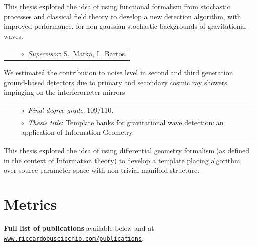 {\small This thesis explored the idea of using functional formalism from stochastic processes and classical field theory to develop a new detection algorithm, with improved performance, for non-gaussian stochastic backgrounds of gravitational waves.}

\vspace{0.2cm}
\vspace{-0.1cm}
\begin{tabular}{rcl}
&\hspace{0.4cm} &$\circ\;\;${\textit{Supervisor}}: S.~Marka, I.~Bartos.
\end{tabular}
\vspace{0.2cm}

{\small We estimated the contribution to noise level in second and third generation ground-based detectors due to primary and secondary cosmic ray showers impinging on the interferometer mirrors.}

\vspace{0.2cm}
\vspace{-0.1cm}
\begin{tabular}{rcl}
&\hspace{0.4cm} &$\circ\;\;${\textit{Final degree grade}}: 109/110.\\
&\hspace{0.4cm} &$\circ\;\;${\textit{Thesis title}}: Template banks for gravitational wave detection: an application of Information Geometry.
\end{tabular}
\vspace{0.2cm}


{\small This thesis explored the idea of using differential geometry formalism (as defined in the context of Information theory) to develop a template placing algorithm over source parameter space with non-trivial manifold structure.}

\section{Metrics}



\textbf{Full list of publications} available 
below and
at \href{http://www.riccardobuscicchio.com/publications}{\texttt{www.riccardobuscicchio.com/publications}}.

